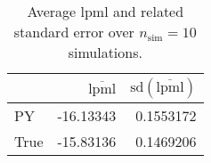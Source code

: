 \begin{table}[H]

\caption{Average lpml and related standard error over $n_{\text{sim}} = 10$ simulations.}
\centering
\begin{tabular}[t]{lrr}
\toprule
  & $\overbar{\text{lpml}}$ & $\text{sd}(\overbar{\text{lpml}})$\\
\midrule
PY & -16.13343 & 0.1553172\\
True & -15.83136 & 0.1469206\\
\bottomrule
\end{tabular}
\end{table}